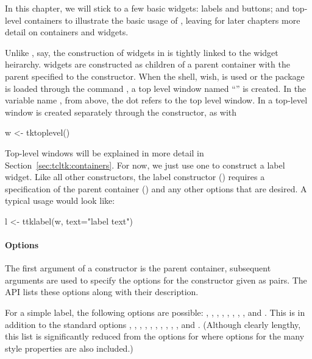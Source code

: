 In this chapter, we will stick to a few basic widgets: labels and
buttons; and top-level containers to illustrate the basic usage of
, leaving for later chapters more detail on containers and
widgets. 

Unlike \GTK, say, the construction of widgets in  is tightly linked to the widget heirarchy. \TK\/ widgets are constructed as children of a parent container with the parent specified to the constructor. When the \TK\/ shell, wish, is used or the \TK\/ package is loaded through the \TCL\/ command , a top level window named ``'' is created. In the variable name , from above, the dot refers to the top level window. 
In  a top-level window is created separately through the  constructor, as with
\begin{Schunk}
\begin{Sinput}
 w <- tktoplevel()
\end{Sinput}
\end{Schunk}

Top-level windows will be explained in more detail in Section~\ref{sec:tcltk:containers}. For now, we just use one to construct a label widget. Like all other constructors, the label constructor () requires a specification of the parent container () and any other options that are desired. A typical usage would look like:
\begin{Schunk}
\begin{Sinput}
 l <- ttklabel(w, text="label text")
\end{Sinput}
\end{Schunk}

\paragraph{Options}
The first argument of a constructor is the parent container, subsequent arguments are
used to specify the options for the constructor given as  pairs. The \TK\/ API lists
these options along with their description.

For a simple label, the following options are possible:
, , , , , , , ,
and .  This is in addition to the standard options ,
, , , , , , , ,
, and . (Although clearly lengthy, this list is significantly reduced from the options for  where options for the many style properties are also included.)

